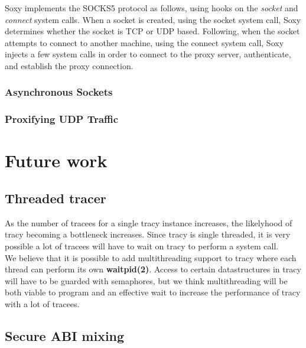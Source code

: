 \documentclass[a4paper, 10pt]{report}
\begin{document}
Soxy implements the SOCKS5 protocol as follows, using hooks on the
\textit{socket} and \textit{connect} system calls. When a
socket is created, using the socket system call, Soxy determines whether the
socket is TCP or UDP based. Following, when the socket attempts to connect to
another machine, using the connect system call, Soxy injects a few system
calls in order to connect to the proxy server, authenticate, and establish the
proxy connection.

\subsection{Asynchronous Sockets}

\subsection{Proxifying UDP Traffic}

\chapter{Future work}

\section{Threaded tracer}

As the number of tracees for a single tracy instance increases, the
likelyhood of tracy becoming a bottleneck increases. Since tracy is
single threaded, it is very possible a lot of tracees will have to wait
on tracy to perform a system call. \\

We believe that it is possible to add multithreading support to tracy where
each thread can perform its own \textbf{waitpid(2)}. Access to certain
datastructures in tracy will have to be guarded with semaphores, but
we think multithreading will be both viable to program and an effective
wait to increase the performance of tracy with a lot of tracees.

\section{Secure ABI mixing}
\label{secure-abi}
\end{document}
